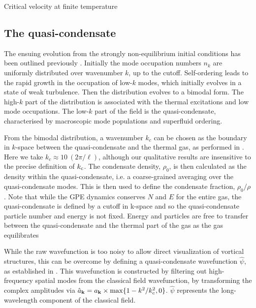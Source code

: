 \begin{chapter}{\label{cha:nonequib}Critical velocity at finite temperature}
\subsection{The quasi-condensate}
The ensuing evolution from the strongly non-equilibrium initial conditions has been outlined previously \cite{PhysRevA.66.013603,pattinson_2014}.  Initially the mode occupation numbers $n_k$ are uniformly distributed over wavenumber $k$, up to the cutoff.  Self-ordering leads to the rapid growth in the occupation of low-$k$ modes, which initially evolves in a state of weak turbulence.  Then the distribution evolves to a bimodal form.
The high-$k$ part of the distribution is associated with the
thermal excitations and low mode occupations.
The low-$k$ part of the field is the quasi-condensate,
characterised by macroscopic mode populations and superfluid ordering.

From the bimodal distribution, a wavenumber $k_c$ can be chosen as the boundary in $k$-space between the quasi-condensate and the thermal gas, as performed in \cite{PhysRevA.66.013603}.  Here we take $k_c \approx 10~(2\pi / \ell)$, although our qualitative results are insensitive to the precise definition of $k_{\rm c}$.  The condensate density, $\rho_0$, is then calculated as the density within the quasi-condensate, i.e. a coarse-grained averaging over the quasi-condensate modes.  This is then used to define the condensate fraction, $\rho_0/\rho$. Note that while the GPE dynamics conserves $N$ and $E$ for the entire gas, the quasi-condensate is defined by a cutoff in k-space and so the quasi-condensate particle number and energy is not fixed. Energy and particles are free to transfer between the quasi-condensate and the thermal part of the gas as the gas equilibrates

While the raw wavefunction is too noisy to allow direct visualization of vortical structures, this can be overcome by defining a quasi-condensate wavefunction $\hat{\psi}$, as established in \cite{PhysRevA.66.013603}.   This wavefunction is constructed by filtering out high-frequency spatial modes from the classical field wavefunction, by 
transforming the complex amplitudes via
$\hat{a}_{{\bf k}} = a_{{\bf k}}\times\max\{1-k^{2}/k_c^2,0\}$. $\hat{\psi}$ represents the long-wavelength component of the classical field.



\end{chapter}
